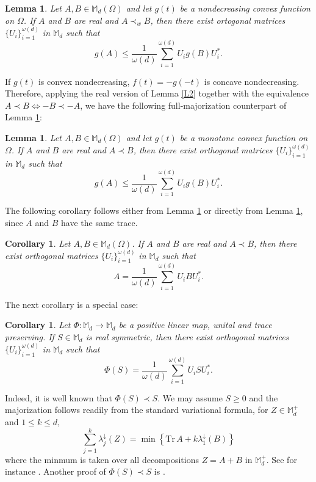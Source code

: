\documentclass[12pt,reqno]{article}
\newtheorem{lemma}[theorem]{Lemma}
\newtheorem{cor}[theorem]{Corollary}
\theoremstyle{definition}
\theoremstyle{remark}
\numberwithin{equation}{section}
\def\bM{\mathbb{M}}
\begin{document}
\vskip 5pt
\begin{lemma}\label{L3} Let $A,B\in\bM_d(\Omega)$ and let $g(t)$ be a nondecreasing convex function on $\Omega$. If $A$ and $B$ are real and  $A\prec_w B$, then 
there exist ortogonal matrices $\{U_i\}_{i=1}^{\omega(d)}$  in $\bM_d$ such that 
$$
g(A)\le \frac{1}{\omega(d)}\sum_{i=1}^{\omega(d)} U_i g(B)U_i^*.
$$
\end{lemma}


\vskip 5pt
If $g(t)$ is convex nondecreasing, $f(t)=-g(-t)$ is concave nondecreasing. Therefore, applying the real version of Lemma \ref{L2} together with the equivalence $A\prec B\iff -B\prec -A$, we have the following full-majorization counterpart of Lemma \ref{L3}:


\vskip 5pt
\begin{lemma}\label{L4} Let $A,B\in\bM_d(\Omega)$ and let $g(t)$ be a monotone convex function on $\Omega$. If $A$ and $B$ are real and  $A\prec B$, then 
there exist orthogonal matrices $\{U_i\}_{i=1}^{\omega(d)}$  in $\bM_d$ such that 
$$
g(A)\le \frac{1}{\omega(d)}\sum_{i=1}^{\omega(d)} U_i g(B)U_i^*.
$$
\end{lemma}


\vskip 5pt
The following corollary follows either from Lemma \ref{L4} or directly from Lemma \ref{L3}, since $A$ and $B$ have the same trace.




\vskip 5pt
\begin{cor}\label{correalprec} Let $A,B\in\bM_d(\Omega)$. If $A$ and $B$ are real and  $A\prec B$, then 
there exist orthogonal matrices $\{U_i\}_{i=1}^{\omega(d)}$  in $\bM_d$ such that 
$$
A= \frac{1}{\omega(d)}\sum_{i=1}^{\omega(d)} U_i BU_i^*.
$$
\end{cor}


\vskip 5pt
The next corollary is a special case:

\vskip 5pt
\begin{cor} Let $\Phi:\bM_d\to\bM_d$ be a positive linear map, unital and trace preserving.  If $S\in\bM_d$ is real symmetric, then there exist orthogonal matrices  $\{U_i\}_{i=1}^{\omega(d)}$  in $\bM_d$ such that 
$$
\Phi(S) =\frac{1}{\omega(d)}\sum_{i=1}^{\omega(d)} U_iSU_i^*.
$$
\end{cor}


\vskip 5pt
Indeed, it is well known that $\Phi(S)\prec S$. We may assume  $S\ge 0$ and 
the majorization follows readily from the standard variational formula, for $Z\in\bM_d^+$ and $1\le k\le d$,
$$
\sum_{j=1}^k \lambda_j^{\downarrow}(Z)=\min\left\{\mathrm{Tr\,}A +k \lambda_1^{\downarrow}(B)\right\}
$$
where the minmum is taken over all decompositions  $Z=A+B$ in $\bM_d^+$. See for instance \cite[Theorem 6.20]{HiP}. Another proof of $\Phi(S)\prec S$ is  \cite[Theorem 7.1]{Ando}.
\end{document}
